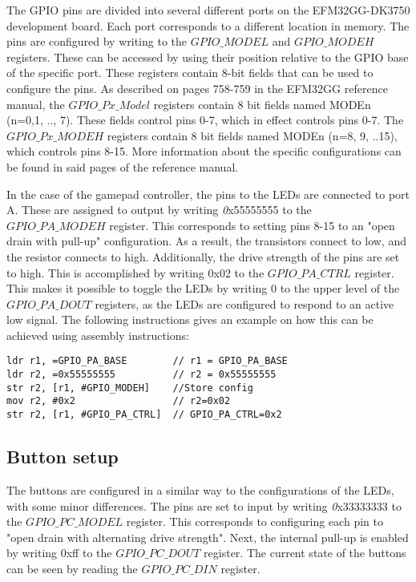 The GPIO pins are divided into several different ports on the EFM32GG-DK3750 development board. Each port corresponds to a different location in memory.  The pins are configured by writing to the $GPIO\_MODEL$ and $GPIO\_MODEH$ registers. These can be accessed by using their position relative to the GPIO base of the specific port. These registers contain 8-bit fields that can be used to configure the pins. As described on pages 758-759 in the EFM32GG reference manual, the $GPIO\_Px\_Model$ registers contain 8 bit fields named MODEn (n=0,1, .., 7). These fields control pins 0-7, which in effect controls pins 0-7. The $GPIO\_Px\_MODEH$ registers contain 8 bit fields named MODEn (n=8, 9, ..15), which controls pins 8-15. More information about the specific configurations can be found in said pages of the reference manual.

In the case of the gamepad controller, the pins to the LEDs are connected to port A. These are assigned to output by writing {\emph 0x55555555} to  the $GPIO\_PA\_MODEH$ register. This corresponds to setting pins 8-15 to an "open drain with pull-up" configuration\cite[p.758-759]{EFM32GG-rm}. As a result, the transistors connect to low, and the resistor connects to high. Additionally, the drive strength of the pins are set to high. This is accomplished by writing 0x02 to the $GPIO\_PA\_CTRL$ register. This makes it possible to toggle the LEDs by writing 0 to the upper level of the $GPIO\_PA\_DOUT$ registers, as the LEDs are configured to respond to an active low signal. The following instructions gives an example on how this can be achieved using assembly instructions:


\begin{lstlisting}
ldr r1, =GPIO_PA_BASE        // r1 = GPIO_PA_BASE
ldr r2, =0x55555555          // r2 = 0x55555555  
str r2, [r1, #GPIO_MODEH]    //Store config
mov r2, #0x2                 // r2=0x02
str r2, [r1, #GPIO_PA_CTRL]  // GPIO_PA_CTRL=0x2                    

\end{lstlisting}


 

\subsection{Button setup}\label{ch:buttons}
The buttons are configured in a similar way to the configurations of the LEDs, with some minor differences. The pins are set to input by writing {\emph 0x33333333} to the $GPIO\_PC\_MODEL$ register. This corresponds to configuring each pin to "open drain with alternating drive strength"\cite[p.758-759]{EFM32GG-rm}. Next, the internal pull-up is enabled by writing 0xff to the $GPIO\_PC\_DOUT$ register. The current state of the buttons can be seen by reading the $GPIO\_PC\_DIN$ register. 

